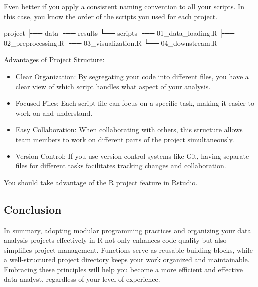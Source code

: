 \documentclass[
]{book}
\newenvironment{Shaded}{\begin{snugshade}}{\end{snugshade}}
\newcommand{\ExtensionTok}[1]{#1}
\newcommand{\NormalTok}[1]{#1}
\begin{document}
Even better if you apply a consistent naming convention to all your scripts. In this case, you know the order of the scripts you used for each project.

\begin{Shaded}
\begin{Highlighting}[]
\ExtensionTok{project}
\ExtensionTok{├──}\NormalTok{ data}
\ExtensionTok{├──}\NormalTok{ results}
\ExtensionTok{└──}\NormalTok{ scripts}
    \ExtensionTok{├──}\NormalTok{ 01\_data\_loading.R}
    \ExtensionTok{├──}\NormalTok{ 02\_preprocessing.R}
    \ExtensionTok{├──}\NormalTok{ 03\_visualization.R}
    \ExtensionTok{└──}\NormalTok{ 04\_downstream.R}
\end{Highlighting}
\end{Shaded}

Advantages of Project Structure:

\begin{itemize}
\item
  Clear Organization: By segregating your code into different files, you have a clear view of which script handles what aspect of your analysis.
\item
  Focused Files: Each script file can focus on a specific task, making it easier to work on and understand.
\item
  Easy Collaboration: When collaborating with others, this structure allows team members to work on different parts of the project simultaneously.
\item
  Version Control: If you use version control systems like Git, having separate files for different tasks facilitates tracking changes and collaboration.
\end{itemize}

You should take advantage of the \href{https://support.posit.co/hc/en-us/articles/200526207-Using-RStudio-Projects}{R project feature} in Rstudio.

\hypertarget{conclusion-14}{%
\subsection{Conclusion}\label{conclusion-14}}

In summary, adopting modular programming practices and organizing your data analysis projects effectively in R not only enhances code quality but also simplifies project management. Functions serve as reusable building blocks, while a well-structured project directory keeps your work organized and maintainable. Embracing these principles will help you become a more efficient and effective data analyst, regardless of your level of experience.
\end{document}
